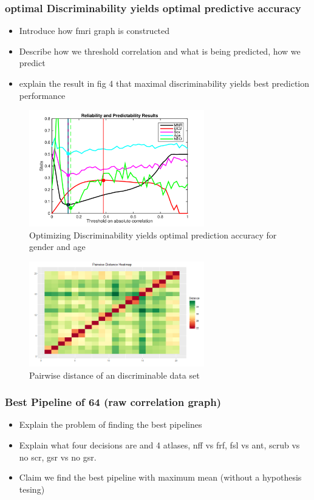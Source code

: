 \documentclass{article}
\begin{document}
\subsubsection{optimal Discriminability yields optimal predictive accuracy}
\begin{itemize}
\item Introduce how fmri graph is constructed
\item Describe how we threshold correlation and what is being predicted, how we predict
\item explain the result in fig 4 that maximal discriminability yields best prediction performance 
\end{itemize}

\begin{figure}[t!]
\includegraphics[width=3.0in]{../Figs/HCP.png}
\caption{Optimizing Discriminability yields optimal prediction accuracy for gender and age}
\label{fig:4}
\end{figure}

\begin{figure}[t!]
	\includegraphics[width=3.0in]{../Figs/pairdistance.png}
	\caption{Pairwise distance of an discriminable data set}
	\label{fig:5}
\end{figure}


\subsubsection{Best Pipeline of 64 (raw correlation graph)}
\begin{itemize}
	\item Explain the problem of finding the best pipelines
	\item Explain what four decisions are  and 4 atlases, nff vs frf, fsl vs ant, scrub vs no scr, gsr vs no gsr. 
	\item Claim we find the best pipeline with maximum mean (without a hypothesis tesing)
\end{itemize}
\end{document}
